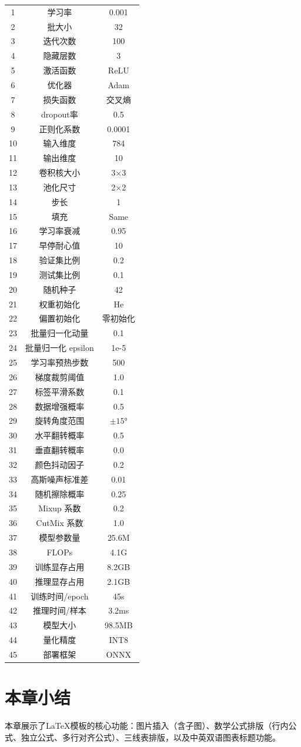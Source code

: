 \begin{longtable}{ccc}
    1 & 学习率 & 0.001 \\
    2 & 批大小 & 32 \\
    3 & 迭代次数 & 100 \\
    4 & 隐藏层数 & 3 \\
    5 & 激活函数 & ReLU \\
    6 & 优化器 & Adam \\
    7 & 损失函数 & 交叉熵 \\
    8 &  dropout率 & 0.5 \\
    9 & 正则化系数 & 0.0001 \\
    10 & 输入维度 & 784 \\
    11 & 输出维度 & 10 \\
    12 & 卷积核大小 & 3$\times$3 \\
    13 & 池化尺寸 & 2$\times$2 \\
    14 & 步长 & 1 \\
    15 & 填充 & Same \\
    16 & 学习率衰减 & 0.95 \\
    17 & 早停耐心值 & 10 \\
    18 & 验证集比例 & 0.2 \\
    19 & 测试集比例 & 0.1 \\
    20 & 随机种子 & 42 \\
    21 & 权重初始化 & He \\
    22 & 偏置初始化 & 零初始化 \\
    23 & 批量归一化动量 & 0.1 \\
    24 & 批量归一化 epsilon & 1e-5 \\
    25 & 学习率预热步数 & 500 \\
    26 & 梯度裁剪阈值 & 1.0 \\
    27 & 标签平滑系数 & 0.1 \\
    28 & 数据增强概率 & 0.5 \\
    29 & 旋转角度范围 & $\pm15°$ \\
    30 & 水平翻转概率 & 0.5 \\
    31 & 垂直翻转概率 & 0.0 \\
    32 & 颜色抖动因子 & 0.2 \\
    33 & 高斯噪声标准差 & 0.01 \\
    34 & 随机擦除概率 & 0.25 \\
    35 & Mixup 系数 & 0.2 \\
    36 & CutMix 系数 & 1.0 \\
    37 & 模型参数量 & 25.6M \\
    38 & FLOPs & 4.1G \\
    39 & 训练显存占用 & 8.2GB \\
    40 & 推理显存占用 & 2.1GB \\
    41 & 训练时间/epoch & 45s \\
    42 & 推理时间/样本 & 3.2ms \\
    43 & 模型大小 & 98.5MB \\
    44 & 量化精度 & INT8 \\
    45 & 部署框架 & ONNX \\
\end{longtable}

\section{本章小结}

本章展示了LaTeX模板的核心功能：图片插入（含子图）、数学公式排版（行内公式、独立公式、多行对齐公式）、三线表排版，以及中英双语图表标题功能。
